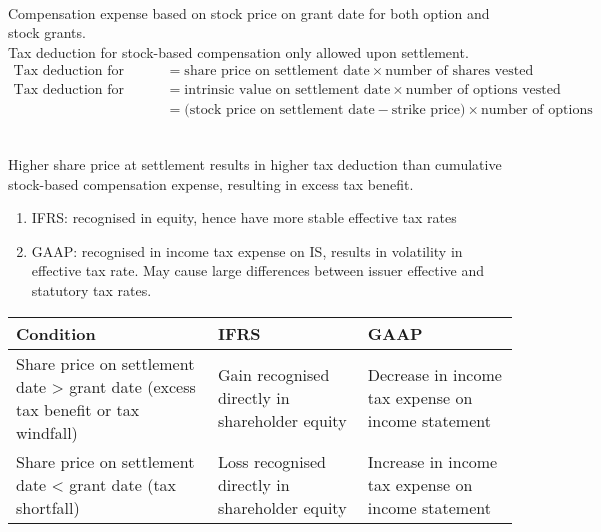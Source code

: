 \begin{remark} \\
Compensation expense based on stock price on grant date for both option and stock grants.\\
Tax deduction for stock-based compensation only allowed upon settlement.
\begin{align}
\text{Tax deduction for stock grants} &= \text{share price on settlement date} \times \text{number of shares vested} \nonumber \\
\text{Tax deduction for options} &= \text{intrinsic value on settlement date} \times \text{number of options vested} \nonumber \\
&= \text{(stock price on settlement date} - \text{strike price)} \times \text{number of options} \nonumber
\end{align}
\end{remark}

\begin{remark} \\
Higher share price at settlement results in higher tax deduction than cumulative stock-based compensation expense, resulting in excess tax benefit.
\begin{enumerate}[label=\roman*.]
\setlength{\itemsep}{0pt}
\item IFRS: recognised in equity, hence have more stable effective tax rates
\item GAAP: recognised in income tax expense on IS, results in volatility in effective tax rate. May cause large differences between issuer effective and statutory tax rates.
\end{enumerate}
\end{remark}

\begin{flushleft}
\begin{tabularx}{\textwidth}{p{20em}|X|X}
\hline
\rowcolor{gray!30}
Condition & IFRS & GAAP \\
\hline
Share price on settlement date > grant date (excess tax benefit or tax windfall) &
Gain recognised directly in shareholder equity &
Decrease in income tax expense on income statement \\
\hline
Share price on settlement date < grant date (tax shortfall) &
Loss recognised directly in shareholder equity &
Increase in income tax expense on income statement \\
\hline
\end{tabularx}
\end{flushleft}

